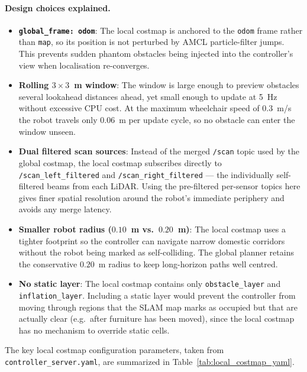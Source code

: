 \paragraph{Design choices explained.}
\begin{itemize}\itemsep=2pt
    \item \textbf{\texttt{global\_frame: odom}}: The local costmap is anchored to the \texttt{odom} frame rather than \texttt{map}, so its position is not perturbed by AMCL particle-filter jumps. This prevents sudden phantom obstacles being injected into the controller's view when localisation re-converges.
    \item \textbf{Rolling $3 \times 3$~m window}: The window is large enough to preview obstacles several lookahead distances ahead, yet small enough to update at 5~Hz without excessive CPU cost. At the maximum wheelchair speed of $0.3$~m/s the robot travels only $0.06$~m per update cycle, so no obstacle can enter the window unseen.
    \item \textbf{Dual filtered scan sources}: Instead of the merged \texttt{/scan} topic used by the global costmap, the local costmap subscribes directly to \texttt{/scan\_left\_filtered} and \texttt{/scan\_right\_filtered} --- the individually self-filtered beams from each LiDAR. Using the pre-filtered per-sensor topics here gives finer spatial resolution around the robot's immediate periphery and avoids any merge latency.
    \item \textbf{Smaller robot radius ($0.10$~m vs.\ $0.20$~m)}: The local costmap uses a tighter footprint so the controller can navigate narrow domestic corridors without the robot being marked as self-colliding. The global planner retains the conservative $0.20$~m radius to keep long-horizon paths well centred.
    \item \textbf{No static layer}: The local costmap contains only \texttt{obstacle\_layer} and \texttt{inflation\_layer}. Including a static layer would prevent the controller from moving through regions that the SLAM map marks as occupied but that are actually clear (e.g.\ after furniture has been moved), since the local costmap has no mechanism to override static cells.
\end{itemize}

The key local costmap configuration parameters, taken from \texttt{controller\_server.yaml}, are summarized in Table~\ref{tab:local_costmap_yaml}.

